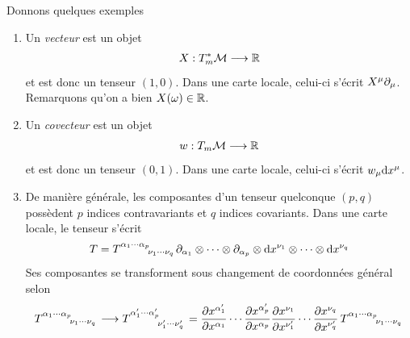 \begin{exmp} Donnons quelques exemples\\
    \begin{enumerate}
        \item Un \emph{vecteur} est un objet 
        \begin{equation}
            X:T_m^*\mathcal{M} \longrightarrow \mathbb{R}
        \end{equation}
        et est donc un tenseur $(1,0)$. Dans une carte locale, celui-ci s'écrit $X^\mu \partial_\mu$. Remarquons qu'on a bien $X(\omega) \in \mathbb{R}$.
        \item Un \emph{covecteur} est un objet 
        \begin{equation}
            w:T_m\mathcal{M} \longrightarrow \mathbb{R}
        \end{equation}
        et est donc un tenseur $(0,1)$. Dans une carte locale, celui-ci s'écrit $w_\mu \mathrm{d} x^\mu$.
        \item De manière générale, les composantes d'un tenseur quelconque $(p,q)$ possèdent $p$ indices contravariants et $q$ indices covariants. Dans une carte locale, le tenseur s'écrit
        \begin{equation}
            T = T\indices{^{\alpha_1} ^{\cdots}^{\alpha_p}_{\nu_1}_{\cdots} _{\nu_q}} \partial_{\alpha_{1}}
            \otimes \cdots \otimes \partial_{\alpha_{p}} \otimes \td x^{\nu_{1}}\otimes \cdots\otimes \td x^{\nu_{q}} 
        \end{equation}
        Ses composantes se transforment sous changement de coordonnées général selon
        \begin{equation}
            T\indices{^{\alpha_1} ^{\cdots}^{\alpha_p}_{\nu_1}_{\cdots} _{\nu_q}} \longrightarrow T\indices{^{\alpha'_1} ^{\cdots}^{\alpha'_p}_{\nu'_1}_{\cdots} _{\nu'_q}} = \frac{\partial x^{\alpha'_1}}{\partial x^{\alpha_1}} \cdots\frac{\partial x^{\alpha'_p}}{\partial x^{\alpha_p}}\frac{\partial x^{\nu_1}}{\partial x^{\nu'_1}}\cdots\frac{\partial x^{\nu_q}}{\partial x^{\nu'_q}}\, T\indices{^{\alpha_1} ^{\cdots}^{\alpha_p}_{\nu_1}_{\cdots} _{\nu_q}}
        \end{equation}
    \end{enumerate}
\end{exmp}
